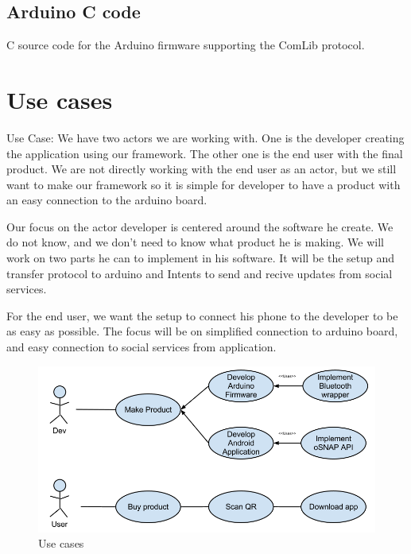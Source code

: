 \subsection{Arduino C code}
C source code for the Arduino firmware supporting the ComLib protocol.


\section{Use cases}
Use Case:
We have two actors we are working with. One is the developer creating the application using our framework.
The other one is the end user with the final product. We are not directly working with the end user as an actor,
but we still want to make our framework so it is simple for developer to have a product with an easy connection to the arduino board.

Our focus on the actor developer is centered around the software he create. We do not know, and we don't need to
know what product he is making. We will work on two parts he can to implement in his software. It will be the setup and
transfer protocol to arduino and Intents to send and recive updates from social services.

For the end user, we want the setup to connect his phone to the developer to be as easy as possible. The focus will be on
simplified connection to arduino board, and easy connection to social services from application.

\begin{figure}[hb!]
\centering \includegraphics[scale=0.50]{img/use-cases.png}
\caption{Use cases}
\label{fig:architecture-usecases}
\end{figure}